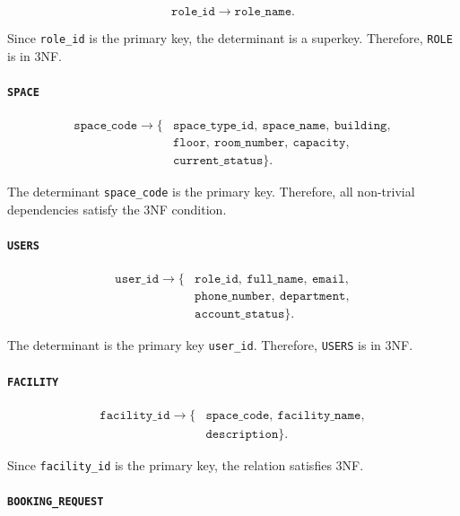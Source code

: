 \[
\texttt{role\_id}
\rightarrow
\texttt{role\_name}.
\]

Since \texttt{role\_id} is the primary key, the determinant is a
superkey. Therefore, \texttt{ROLE} is in 3NF.

\paragraph{\texttt{SPACE}}

\[
\begin{aligned}
\texttt{space\_code} \rightarrow \{&
\texttt{space\_type\_id},\ \texttt{space\_name},\ \texttt{building},\\
&\texttt{floor},\ \texttt{room\_number},\ \texttt{capacity},\\
&\texttt{current\_status}\}.
\end{aligned}
\]

The determinant \texttt{space\_code} is the primary key. Therefore,
all non-trivial dependencies satisfy the 3NF condition.

\paragraph{\texttt{USERS}}

\[
\begin{aligned}
\texttt{user\_id} \rightarrow \{&
\texttt{role\_id},\ \texttt{full\_name},\ \texttt{email},\\
&\texttt{phone\_number},\ \texttt{department},\\
&\texttt{account\_status}\}.
\end{aligned}
\]

The determinant is the primary key \texttt{user\_id}. Therefore,
\texttt{USERS} is in 3NF.

\paragraph{\texttt{FACILITY}}

\[
\begin{aligned}
\texttt{facility\_id} \rightarrow \{&
\texttt{space\_code},\ \texttt{facility\_name},\\
&\texttt{description}\}.
\end{aligned}
\]

Since \texttt{facility\_id} is the primary key, the relation satisfies
3NF.

\paragraph{\texttt{BOOKING\_REQUEST}}

